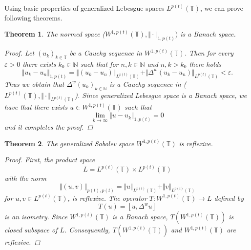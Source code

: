 \documentclass[12pt,a4paper,oneside,titlepage]{article}
\newtheorem{Twierdzenie}{Theorem}
\renewcommand{\epsilon}{\varepsilon}
\begin{document}
Using basic properties of generalized Lebesgue spaces $L^{p(t)}(\mathbb{T})$, we can prove following theorems.
\begin{Twierdzenie} The normed space ($W^{1,p(t)}({\mathbb{T}}), \Vert \cdot \Vert_{1,p(t)} ) $ is a Banach space.
\begin{proof}
Let $(u_k)_{k \in \mathbb{T}}$ be a Cauchy sequence in $W^{1,p(t)}(\mathbb{T})$. Then for every $\epsilon>0$ there exists $k_0 \in \mathbb{N}$ such that for $n,k \in \mathbb{N}$ and $n,k>k_0$ there holds
\begin{equation}
\nonumber
\Vert u_k - u_n \Vert_{1,p(t)} =  \Vert  (u_k - u_n ) \Vert_{L^{p(t)}(\mathbb{T})} +\Vert  \Delta^{w} (u_k - u_n ) \Vert_{L^{p(t)}(\mathbb{T})} < \epsilon.
\end{equation}
 Thus we obtain that  $ \Delta^{w} (u_k )_{k \in \mathbb{N}}$ is a Cauchy sequence in ($L^{p(t)}(\mathbb{T}), \Vert \cdot \Vert_{L^{p(t)}(\mathbb{T})}$). Since generalized Lebesgue space is a Banach space, we have that there exists $u \in W^{1,p(t)}(\mathbb{T})$ such that
\begin{equation}
\nonumber
 \lim_{k \rightarrow \infty}\Vert u - u_k \Vert_{1,p(t)}=0 
\end{equation} 
and it completes the proof. 
\end{proof}
\end{Twierdzenie}
\begin{Twierdzenie} 
The generalized Sobolev space $W^{1,p(t)}(\mathbb{T})$ is reflexive.
\begin{proof}
First, the product space 
\begin{equation}
\nonumber
L=L^{p(t)}(\mathbb{T}) \times L^{p(t)}(\mathbb{T})
\end{equation}
with the norm
\begin{equation}
\nonumber
\Vert (u,v) \Vert_{p(t),p(t)} = \Vert u \Vert_{L^{p(t)}(\mathbb{T})} + \Vert v \Vert_{L^{p(t)}(\mathbb{T})}
\end{equation}
for $u,v \in L^{p(t)}(\mathbb{T}) $, is reflexive. The operator $T:W^{1,p(t)}(\mathbb{T}) \rightarrow L $ defined by
\begin{equation}
\label{operator_T}
T(u) = [u, \Delta^{w} u] 
\end{equation}
is an isometry. Since $W^{1,p(t)}(\mathbb{T})$ is a Banach space, $T(W^{1,p(t)}( \mathbb{T}))$ is closed subspace of $L$. Consequently, $T(W^{1,p(t)}(\mathbb{T}))$ and $W^{1,p(t)}(\mathbb{T}) $ are reflexive.
\end{proof}
\end{Twierdzenie}
\end{document}
